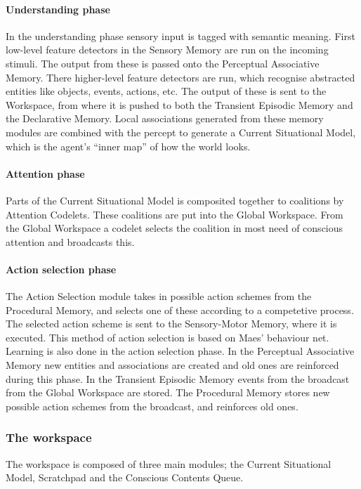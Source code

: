 \paragraph{Understanding phase}
In the understanding phase sensory input is tagged with semantic meaning. First low-level feature detectors in the Sensory Memory are run on the incoming stimuli. The output from these is passed onto the Perceptual Associative Memory. There higher-level feature detectors are run, which recognise abstracted entities like objects, events, actions, etc. The output of these is sent to the Workspace, from where it is pushed to both the Transient Episodic Memory and the Declarative Memory. Local associations generated from these memory modules are combined with the percept to generate a Current Situational Model, which is the agent's ``inner map'' of how the world looks.
\paragraph{Attention phase} Parts of the Current Situational Model is composited together to coalitions by Attention Codelets. These coalitions are put into the Global Workspace. From the Global Workspace a codelet selects the coalition in most need of conscious attention and broadcasts this.
\paragraph{Action selection phase} The Action Selection module takes in possible action schemes from the Procedural Memory, and selects one of these according to a competetive process. The selected action scheme is sent to the Sensory-Motor Memory, where it is executed. This method of action selection is based on Maes' behaviour net.\cite{maes1989right} Learning is also done in the action selection phase. In the Perceptual Associative Memory new entities and associations are created and old ones are reinforced during this phase. In the Transient Episodic Memory events from the broadcast from the Global Workspace are stored. The Procedural Memory stores new possible action schemes from the broadcast, and reinforces old ones.


\subsubsection{The workspace}
The workspace is composed of three main modules; the Current Situational Model, Scratchpad and the Conscious Contents Queue.

